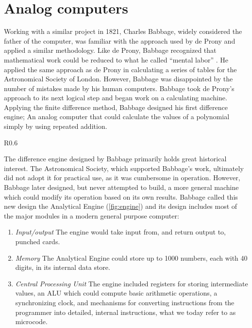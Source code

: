 \documentclass[\rootfolder/main.tex]{subfiles}
\begin{document}
\section{Analog computers}

Working with a similar project in 1821, Charles Babbage, widely considered the father of the computer, was familiar with the approach used by de Prony and applied a similar methodology.
Like de Prony, Babbage recognized that mathematical work could be reduced to what he called ``mental labor'' \cite{babbage1832}.
He applied the same approach as de Prony in calculating a series of tables for the Astronomical Society of London.
However, Babbage was disappointed by the number of mistakes made by his human computers.
Babbage took de Prony's approach to its next logical step and began work on a calculating machine.
Applying the finite difference method, Babbage designed his first difference engine; An analog computer that could calculate the values of a polynomial simply by using repeated addition.

\begin{wrapfigure}{R}{0.6\columnwidth}
    \caption[Babbage's Analytical Engine]
            {Babbage's Analytical Engine. \\ Courtesy of the Science Museum, London \label{fig:engine}}
\end{wrapfigure}

The difference engine designed by Babbage primarily holds great historical interest.
The Astronomical Society, which supported Babbage's work, ultimately did not adopt it for practical use, as it was cumbersome in operation.
However, Babbage later designed, but never attempted to build, a more general machine which could modify its operation based on its own results.
Babbage called this new design the Analytical Engine (\cref{fig:engine}) and its design includes most of the major modules in a modern general purpose computer:

\begin{enumerate}
  \item \textit{Input/output} The engine would take input from, and return output to, punched cards.
  \item \textit{Memory} The Analytical Engine could store up to 1000 numbers, each with 40 digits, in its internal data store.
  \item \textit{Central Processing Unit} The engine included registers for storing intermediate values, an ALU which could compute basic arithmetic operations, a synchronizing clock,
      and mechanisms for converting instructions from the programmer into detailed, internal instructions, what we today refer to as microcode.
\end{enumerate}
\end{document}
